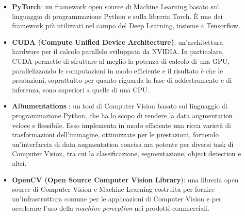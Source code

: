 \begin{itemize}
    \item \textbf{PyTorch}: un framework open source di Machine Learning basato sul linguaggio di programmazione Python e sulla libreria Torch. È uno dei framework più utilizzati nel campo del Deep Learning, insieme a Tensorflow.
    
    \item \textbf{CUDA (Compute Unified Device Architecture)}: un’architettura hardware per il calcolo parallelo sviluppata da NVIDIA. In particolare, CUDA permette di sfruttare al meglio la potenza di calcolo di una GPU, parallelizzando le computazioni in modo efficiente e il risultato è che le prestazioni, soprattutto per quanto riguarda la fase di addestramento e di inferenza, sono superiori a quelle di una CPU.
    
    \item \textbf{Albumentations} \cite{albumentations}: un tool di Computer Vision basato sul linguaggio di programmazione Python, che ha lo scopo di rendere la data augmentation veloce e flessibile. Esso implementa in modo efficiente una ricca varietà di trasformazioni dell'immagine, ottimizzate per le prestazioni, fornendo un'interfaccia di data augmentation concisa ma potente per diversi task di Computer Vision, tra cui la classificazione, segmentazione, object detection e altri.
    
    \item \textbf{OpenCV (Open Source Computer Vision Library}): una libreria open source di Computer Vision e Machine Learning costruita per fornire un'infrastruttura comune per le applicazioni di Computer Vision e per accelerare l'uso della \textit{machine perception} nei prodotti commerciali.
\end{itemize}


